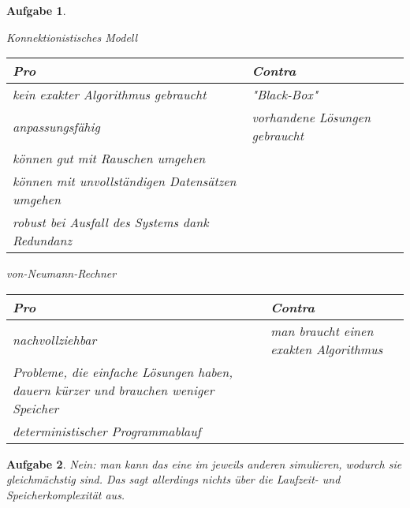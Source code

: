 \documentclass[11pt]{article}
\theoremstyle{break}
\newtheorem{task}{Aufgabe}
\begin{document}
\begin{task}
    \begin{minipage}[t]{0.5\textwidth}
        \begin{center}
            Konnektionistisches Modell\vspace{3mm}\\
            \begin{tabularx}{\textwidth}{X|X}
                Pro & Contra\\\hline
                kein exakter Algorithmus gebraucht & "Black-Box"\\\hline
                anpassungsfähig & vorhandene Lösungen gebraucht\\\hline
                können gut mit Rauschen umgehen & \\\hline
                können mit unvollständigen Datensätzen umgehen & \\\hline
                robust bei Ausfall des Systems dank Redundanz
            \end{tabularx}
        \end{center}
    \end{minipage}
    \begin{minipage}[t]{0.5\textwidth}
        \begin{center}
            von-Neumann-Rechner\vspace{3mm}\\
            \begin{tabularx}{\textwidth}{X|X}
                Pro & Contra\\\hline
                nachvollziehbar & man braucht einen exakten Algorithmus\\\hline
                Probleme, die einfache Lösungen haben, dauern kürzer und brauchen weniger Speicher & \\\hline
                deterministischer Programmablauf & \\\hline
            \end{tabularx}
        \end{center}
    \end{minipage}
\end{task}
\begin{task}
    Nein: man kann das eine im jeweils anderen simulieren, wodurch sie gleichmächstig sind. Das sagt allerdings nichts über die Laufzeit- und Speicherkomplexität aus.
\end{task}
\end{document}
